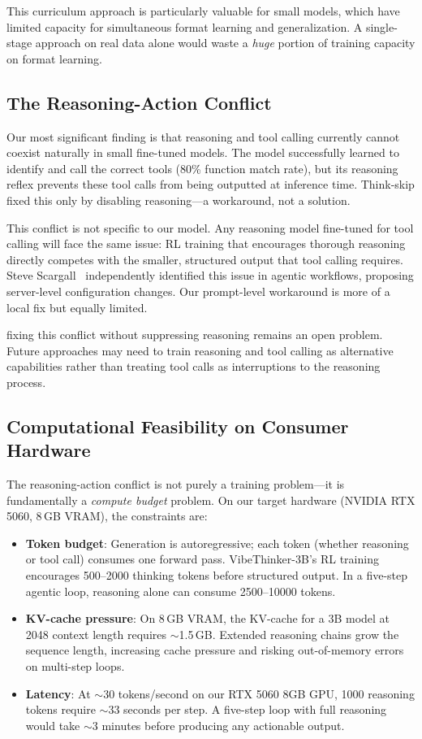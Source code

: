 \documentclass[conference]{IEEEtran}
\begin{document}
This curriculum approach is particularly valuable for small models, which have limited capacity for simultaneous format learning and generalization. A single-stage approach on real data alone would waste a \textit{huge} portion of training capacity on format learning.

\subsection{The Reasoning-Action Conflict}
Our most significant finding is that reasoning and tool calling currently cannot coexist naturally in small fine-tuned models. The model successfully learned to identify and call the correct tools (80\% function match rate), but its reasoning reflex prevents these tool calls from being outputted at inference time. Think-skip fixed this only by disabling reasoning---a workaround, not a solution.

This conflict is not specific to our model. Any reasoning model fine-tuned for tool calling will face the same issue: RL training that encourages thorough reasoning directly competes with the smaller, structured output that tool calling requires. Steve Scargall~\cite{scargall2026thinking} independently identified this issue in agentic workflows, proposing server-level configuration changes. Our prompt-level workaround is more of a local fix but equally limited.

fixing this conflict without suppressing reasoning remains an open problem. Future approaches may need to train reasoning and tool calling as alternative capabilities rather than treating tool calls as interruptions to the reasoning process.

\subsection{Computational Feasibility on Consumer Hardware}
\label{sec:compute}

The reasoning-action conflict is not purely a training problem---it is fundamentally a \textit{compute budget} problem. On our target hardware (NVIDIA RTX 5060, 8\,GB VRAM), the constraints are:

\begin{itemize}
\item \textbf{Token budget}: Generation is autoregressive; each token (whether reasoning or tool call) consumes one forward pass. VibeThinker-3B's RL training encourages 500--2000 thinking tokens before structured output. In a five-step agentic loop, reasoning alone can consume 2500--10000 tokens.
\item \textbf{KV-cache pressure}: On 8\,GB VRAM, the KV-cache for a 3B model at 2048 context length requires $\sim$1.5\,GB. Extended reasoning chains grow the sequence length, increasing cache pressure and risking out-of-memory errors on multi-step loops.
\item \textbf{Latency}: At $\sim$30 tokens/second on our RTX 5060 8GB GPU, 1000 reasoning tokens require $\sim$33 seconds per step. A five-step loop with full reasoning would take $\sim$3 minutes before producing any actionable output.
\end{itemize}
\end{document}
